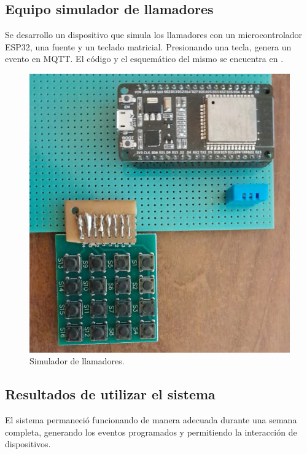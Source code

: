 \subsection{Equipo simulador de llamadores}

Se desarrollo un dispositivo que simula los llamadores con un microcontrolador ESP32, una fuente y un teclado matricial. Presionando una tecla, genera un evento en MQTT. El código y el esquemático del mismo se encuentra en \citep{WEBSITE:33}. 

\begin{figure}[ht]
	\centering
	\includegraphics[scale=.35]{./Figures/simulador.png}
	\caption{Simulador de llamadores.}
	\label{fig:Simulador de llamadores}
\end{figure}

\subsection{Resultados de utilizar el sistema}

El sistema permaneció funcionando de manera adecuada durante una semana completa, generando los eventos programados y permitiendo la interacción de dispositivos.
